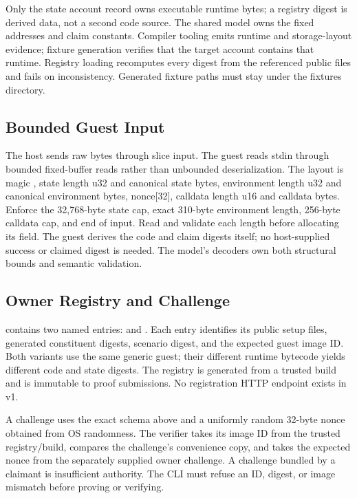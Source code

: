 \documentclass[11pt]{article}
\newcommand{\filepath}[1]{\path{#1}}
\begin{document}
Only the state account record owns executable runtime bytes; a registry digest is derived data, not a second code source. The shared model owns the fixed addresses and claim constants. Compiler tooling emits runtime and storage-layout evidence; fixture generation verifies that the target account contains that runtime. Registry loading recomputes every digest from the referenced public files and fails on inconsistency. Generated fixture paths must stay under the fixtures directory.

\subsection{Bounded Guest Input}
The host sends raw bytes through  slice input. The guest reads stdin through bounded fixed-buffer reads rather than unbounded  deserialization. The layout is magic , state length u32 and canonical state bytes, environment length u32 and canonical environment bytes, nonce[32], calldata length u16 and calldata bytes. Enforce the 32,768-byte state cap, exact 310-byte environment length, 256-byte calldata cap, and end of input. Read and validate each length before allocating its field. The guest derives the code and claim digests itself; no host-supplied success or claimed digest is needed. The model's decoders own both structural bounds and semantic validation.

\subsection{Owner Registry and Challenge}
\filepath{fixtures/registry.json} contains two named entries:  and . Each entry identifies its public setup files, generated constituent digests, scenario digest, and the expected guest image ID. Both variants use the same generic guest; their different runtime bytecode yields different code and state digests. The registry is generated from a trusted build and is immutable to proof submissions. No registration HTTP endpoint exists in v1.

A challenge uses the exact schema above and a uniformly random 32-byte nonce obtained from OS randomness. The verifier takes its image ID from the trusted registry/build, compares the challenge's convenience copy, and takes the expected nonce from the separately supplied owner challenge. A challenge bundled by a claimant is insufficient authority. The CLI must refuse an ID, digest, or image mismatch before proving or verifying.
\end{document}
